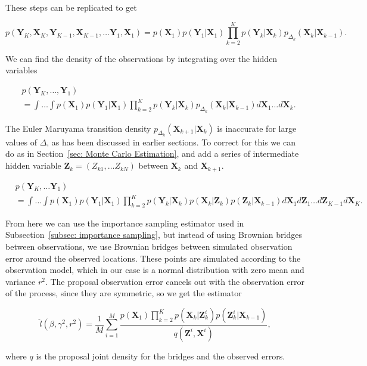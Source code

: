 These steps can be replicated to get 

$$
p(\textbf{Y}_{K}, \textbf{X}_{K}, \textbf{Y}_{K-1} ,\textbf{X}_{K-1} , \dots \textbf{Y}_1, \textbf{X}_1) = p(\textbf{X}_1)p(\textbf{Y}_1|\textbf{X}_1)\prod_{k=2}^K p(\textbf{Y}_k |\textbf{X}_k)p_{\Delta_k}(\textbf{X}_k|\textbf{X}_{k-1}).
$$

We can find the density of the observations by integrating over the hidden variables

$$
\begin{aligned}
&p(\textbf{Y}_K, \dots, \textbf{Y}_1) \\
&= \int \dots \int  p(\textbf{X}_1)p(\textbf{Y}_1|\textbf{X}_1)\prod_{k=2}^K p(\textbf{Y}_k |\textbf{X}_k)p_{\Delta_k}(\textbf{X}_k|\textbf{X}_{k-1}) d\textbf{X}_1 \dots d\textbf{X}_k.
\end{aligned}
$$


The Euler Maruyama transition density $p_{\Delta_k}(\textbf{X}_{k+1}|\textbf{X}_k)$ is inaccurate for large values of $\Delta$, as has been discussed in earlier sections. To correct for this we can do as in Section~\ref{sec: Monte Carlo Estimation}, and add a series of intermediate hidden variable $\textbf{Z}_k = (Z_{k1}, \dots Z_{kN})$ between $\textbf{X}_k$ and $\textbf{X}_{k+1}$. 

$$
\begin{align}
&p(\textbf{Y}_K,\dots \textbf{Y}_1) \\ 
&=  \int \dots \int  p(\textbf{X}_1)p(\textbf{Y}_1|\textbf{X}_1)\prod_{k=2}^K p(\textbf{Y}_k |\textbf{X}_k)p(\textbf{X}_k| \textbf{Z}_k)p(\textbf{Z}_k |\textbf{X}_{k-1}) d\textbf{X}_1d\textbf{Z}_1 \dots d\textbf{Z}_{K-1} d\textbf{X}_K.
\end{align}
$$

From here we can use the importance sampling estimator used in Subsection~\ref{subsec: importance sampling}, but instead of using Brownian bridges between observations, we use Brownian bridges between simulated observation error around the observed locations. These points are simulated according to the observation model, which in our case is a normal distribution with zero mean and variance $r^2$. The proposal observation error cancels out with the observation error of the process, since they are symmetric, so we get the estimator

$$
\hat{l}(\beta, \gamma^2, r^2) =\frac{1}{M} \sum_{i = 1}^M  \frac{p(\textbf{X}_1)\prod_{k=2}^K p(\textbf{X}_k| \textbf{Z}_k^i)p(\textbf{Z}_k^i |\textbf{X}_{k-1})}{q(\textbf{Z}^i,\textbf{X}^i) },
$$

where $q$ is the proposal joint density for the bridges and the observed errors.


